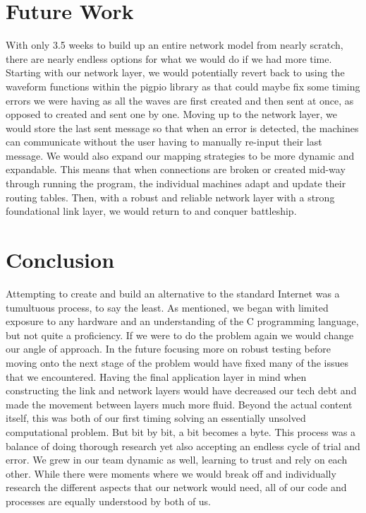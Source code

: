 \documentclass[10pt, letterpaper, twocolumn]{article}
\begin{document}
\section{Future Work}
With only 3.5 weeks to build up an entire network model from nearly scratch, there are nearly endless options for what we would do if we had more time. Starting with our network layer, we would potentially revert back to using the waveform functions within the pigpio library as that could maybe fix some timing errors we were having as all the waves are first created and then sent at once, as opposed to created and sent one by one. Moving up to the network layer, we would store the last sent message so that when an error is detected, the machines can communicate without the user having to manually re-input their last message. We would also expand our mapping strategies to be more dynamic and expandable. This means that when connections are broken or created mid-way through running the program, the individual machines adapt and update their routing tables. Then, with a robust and reliable network layer with a strong foundational link layer, we would return to and conquer battleship. 
\section{Conclusion}
Attempting to create and build an alternative to the standard Internet was a tumultuous process, to say the least. As mentioned, we began with limited exposure to any hardware and an understanding of the C programming language,  but not quite a proficiency. 
If we were to do the problem again we would change our angle of approach. In the future focusing more on robust testing before moving onto the next stage of the problem would have fixed many of the issues that we encountered. Having the final application layer in mind when constructing the link and network layers would have decreased our tech debt and made the movement between layers much more fluid. 
Beyond the actual content itself, this was both of our first timing solving an essentially unsolved computational problem. But bit by bit, a bit becomes a byte. This process was a balance of doing thorough research yet also accepting an endless cycle of trial and error. We grew in our team dynamic as well, learning to trust and rely on each other. While there were moments where we would break off and individually research the different aspects that our network would need, all of our code and processes are equally understood by both of us. 
\cite{cats-lasers,CP341-final,E-design,free-code-camp,gforg-ascii,gforg-manch,NRZ-Community,NRZ-unit-2,NRZ-Vikra}


\end{document}
